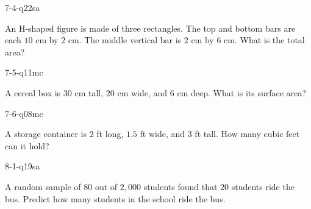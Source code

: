 \begin{practiceQuestion}{7-4-q22}{sa}
\begin{questionText}
An H-shaped figure is made of three rectangles. The top and bottom bars are each $10$ cm by $2$ cm. The middle vertical bar is $2$ cm by $6$ cm. What is the total area?
\end{questionText}
\end{practiceQuestion}

\begin{practiceQuestion}{7-5-q11}{mc}
\begin{questionText}
A cereal box is $30$ cm tall, $20$ cm wide, and $6$ cm deep. What is its surface area?
\end{questionText}
\end{practiceQuestion}

\begin{practiceQuestion}{7-6-q08}{mc}
\begin{questionText}
A storage container is $2$ ft long, $1.5$ ft wide, and $3$ ft tall. How many cubic feet can it hold?
\end{questionText}
\end{practiceQuestion}

\begin{practiceQuestion}{8-1-q19}{sa}
\begin{questionText}
A random sample of $80$ out of $2{,}000$ students found that $20$ students ride the bus. Predict how many students in the school ride the bus.
\end{questionText}
\end{practiceQuestion}

